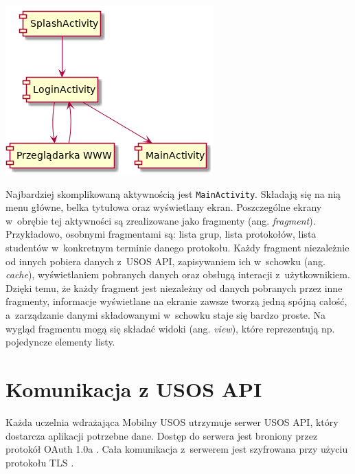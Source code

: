 \documentclass{pracamgr}
\begin{document}
\begingroup
\centering
\includegraphics[scale=0.7]{img/activities.png}
\label{fig:activities}
\medskip
\endgroup

Najbardziej skomplikowaną aktywnością jest \texttt{MainActivity}. Składają się na nią
menu główne, belka tytułowa oraz wyświetlany ekran. Poszczególne ekrany w~obrębie
tej aktywności są zrealizowane jako fragmenty (ang. \textit{fragment}). Przykładowo,
osobnymi fragmentami są: lista grup, lista protokołów, lista studentów w~konkretnym
terminie danego protokołu. Każdy fragment niezależnie od innych pobiera
danych z~USOS API, zapisywaniem ich w~schowku (ang. \textit{cache}),
wyświetlaniem pobranych danych oraz obsługą interacji z~użytkownikiem. Dzięki temu,
że każdy fragment jest niezależny od danych pobranych przez inne fragmenty, informacje
wyświetlane na ekranie zawsze tworzą jedną spójną całość, a~zarządzanie danymi
składowanymi w~schowku staje się bardzo proste. Na wygląd fragmentu mogą się
składać widoki (ang. \textit{view}), które reprezentują np. pojedyncze elementy
listy.

\section{Komunikacja z USOS API}

Każda uczelnia wdrażająca Mobilny USOS utrzymuje serwer USOS API, który dostarcza
aplikacji potrzebne dane. Dostęp do serwera jest broniony przez protokół
OAuth 1.0a \cite{oauth}. Cała komunikacja z~serwerem jest szyfrowana przy użyciu
protokołu TLS \cite{tls12}.
\end{document}
